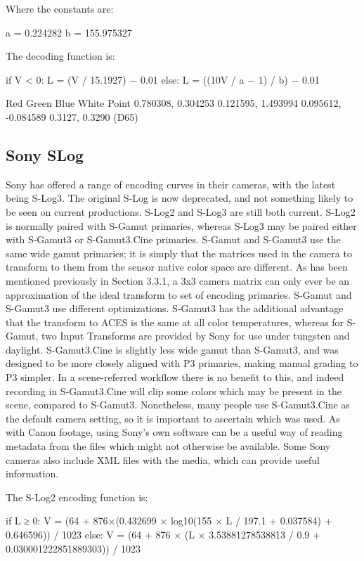 Where the constants are:

	a = 0.224282
b = 155.975327



The decoding function is:

	if V < 0:
		L = (V / 15.1927) − 0.01
	else:
		L = ((10V / a − 1) / b) − 0.01


Red
Green
Blue
White Point
0.780308, 0.304253
0.121595, 1.493994
0.095612, -0.084589
0.3127, 0.3290 (D65)

\subsection{Sony SLog}

Sony has offered a range of encoding curves in their cameras, with the latest being S-Log3. The original S-Log is now deprecated, and not something likely to be seen on current productions. S-Log2 and S-Log3 are still both current. S-Log2 is normally paired with S-Gamut primaries, whereas S-Log3 may be paired either with S-Gamut3 or S-Gamut3.Cine primaries. S-Gamut and S-Gamut3 use the same wide gamut primaries; it is simply that the matrices used in the camera to transform to them from the sensor native color space are different. As has been mentioned previously in Section 3.3.1, a 3x3 camera matrix can only ever be an approximation of the ideal transform to set of encoding primaries. S-Gamut and S-Gamut3 use different optimizations. S-Gamut3 has the additional advantage that the transform to ACES is the same at all color temperatures, whereas for S-Gamut, two Input Transforms are provided by Sony for use under tungsten and daylight. S-Gamut3.Cine is slightly less wide gamut than S-Gamut3, and was designed to be more closely aligned with P3 primaries, making manual grading to P3 simpler. In a scene-referred workflow there is no benefit to this, and indeed recording in S-Gamut3.Cine will clip some colors which may be present in the scene, compared to S-Gamut3. Nonetheless, many people use S-Gamut3.Cine as the default camera setting, so it is important to ascertain which was used. As with Canon footage, using Sony’s own software can be a useful way of reading metadata from the files which might not otherwise be available. Some Sony cameras also include XML files with the media, which can provide useful information.

The S-Log2 encoding function is:

	if L ≥ 0:
		V = (64 + 876×(0.432699 × log10(155 × L / 197.1 + 0.037584) + 0.646596)) / 1023
	else:
		V = (64 + 876 × (L × 3.53881278538813 / 0.9 + 0.030001222851889303)) / 1023

